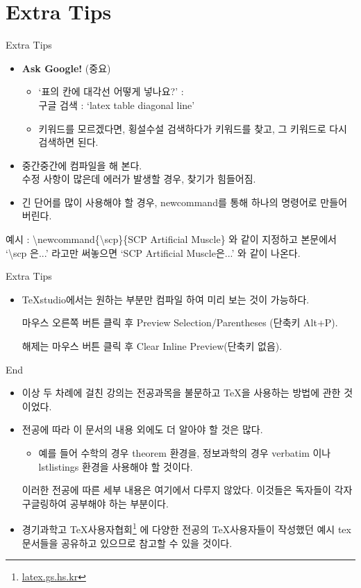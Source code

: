\documentclass[12pt]{beamer}
\begin{document}
\section{Extra Tips}
\begin{frame}{Extra Tips}
	\begin{itemize}
		\item \textbf{Ask Google!} (중요)
		\begin{itemize}
			\item `표의 칸에 대각선 어떻게 넣나요?' : \\
			구글 검색 : `latex table diagonal line'
			\item 키워드를 모르겠다면, 횡설수설 검색하다가 키워드를 찾고, 그 키워드로 다시 검색하면 된다.
		\end{itemize}
		\item 중간중간에 컴파일을 해 본다. \\
		수정 사항이 많은데 에러가 발생할 경우, 찾기가 힘들어짐.
		\item 긴 단어를 많이 사용해야 할 경우, newcommand를 통해 하나의 명령어로 만들어 버린다.
	\end{itemize}
	\begin{footnotesize}
		예시 : \textbackslash newcommand\{\textbackslash scp\}\{SCP Artificial Muscle\} 와 같이 지정하고 본문에서 `\textbackslash scp 은...' 라고만 써놓으면 `SCP Artificial Muscle은...' 와 같이 나온다.
	\end{footnotesize}
\end{frame}
\begin{frame}{Extra Tips}
	\begin{itemize}
		\item TeXstudio에서는 원하는 부분만 컴파일 하여 미리 보는 것이 가능하다. 
		
		마우스 오른쪽 버튼 클릭 후 Preview Selection/Parentheses (단축키 Alt+P).
		
		해제는 마우스 버튼 클릭 후 Clear Inline Preview(단축키 없음).
	\end{itemize}
\end{frame}
\begin{frame}{End}
	\begin{itemize}
		\item 이상 두 차례에 걸친 강의는 전공과목을 불문하고 \TeX 을 사용하는 방법에 관한 것이었다.
		\item 전공에 따라 이 문서의 내용 외에도 더 알아야 할 것은 많다. 
		\begin{itemize}
			\item 예를 들어 수학의 경우 theorem 환경을, 정보과학의 경우 verbatim 이나 lstlistings 환경을 사용해야 할 것이다.
		\end{itemize}
		이러한 전공에 따른 세부 내용은 여기에서 다루지 않았다. 이것들은 독자들이 각자 구글링하여 공부해야 하는 부분이다.
		\item 경기과학고 \TeX 사용자협회\footnote{\url{latex.gs.hs.kr}}  에 다양한 전공의 \TeX 사용자들이 작성했던 예시 tex 문서들을 공유하고 있으므로 참고할 수 있을 것이다.
	\end{itemize}
\end{frame}
\end{document}
